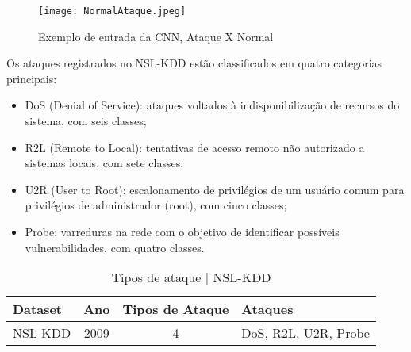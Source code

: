 \documentclass[conference]{IEEEtran}
\begin{document}
    \begin{figure}
        \centering
        \texttt{[image: NormalAtaque.jpeg]}
        \caption{Exemplo de entrada da CNN, Ataque X Normal }
        \label{tab:attack_datasets}
    \end{figure}

    Os ataques registrados no NSL-KDD estão classificados em quatro categorias principais:
    
    \begin{itemize}
        \item DoS (Denial of Service): ataques voltados à indisponibilização de recursos do sistema, com seis classes;
         \item R2L (Remote to Local): tentativas de acesso remoto não autorizado a sistemas locais, com sete classes;
         \item U2R (User to Root): escalonamento de privilégios de um usuário comum para privilégios de administrador (root), com cinco classes;
         \item Probe: varreduras na rede com o objetivo de identificar possíveis vulnerabilidades, com quatro classes.
    \end{itemize}

\hspace{1cm}

\begin{table}[h]
    \centering
    \begin{tabular}{|l|c|c|l|}
    \hline
    \rowcolor[HTML]{C0C0C0} 
    \textbf{Dataset} & \textbf{Ano} & \textbf{Tipos de Ataque} & \textbf{Ataques} \\ \hline
    NSL-KDD & 2009 & 4 & DoS,  R2L, U2R, Probe\\ \hline
    \end{tabular}
    \caption{Tipos de ataque | NSL-KDD}
    \label{tab:attack_datasets}
\end{table}
\end{document}
